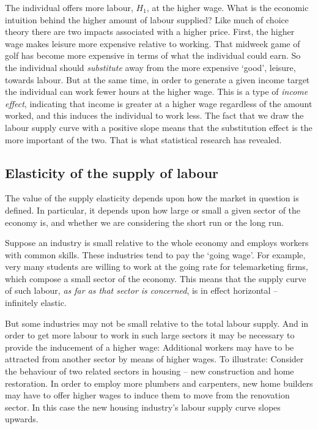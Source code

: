 The individual offers more labour, $H_{1}$, at the higher wage. What is the
economic intuition behind the higher amount of labour supplied? Like much of choice
theory there are two impacts associated with a higher price. First, the
higher wage makes leisure more expensive relative to working. That midweek
game of golf has become more expensive in terms of what the individual could
earn. So the individual should \textit{substitute} away from the more
expensive `good', leisure, towards labour. But at the same time, in order to
generate a given income target the individual can work fewer hours at the
higher wage. This is a type of \textit{income effect}, indicating that
income is greater at a higher wage regardless of the amount worked, and this
induces the individual to work less. The fact that we draw the labour supply
curve with a positive slope means that the substitution effect is
the more important of the two. That is what statistical research has revealed.

\newhtmlpage

\subsection*{Elasticity of the supply of labour}

The value of the supply elasticity depends upon how the market in question
is defined. In particular, it depends upon how large or small a given sector
of the economy is, and whether we are considering the short run or the long
run.

Suppose an industry is small relative to the whole economy and employs
workers with common skills. These industries tend to pay the `going wage'.
For example, very many students are willing to work at the going rate for
telemarketing firms, which compose a small sector of the economy. This means
that the supply curve of such labour, \textit{as far as that sector is
concerned}, is in effect horizontal -- infinitely elastic. 

But some industries may not be small relative to the total labour supply.
And in order to get more labour to work in such large sectors it may be
necessary to provide the inducement of a higher wage: Additional workers may
have to be attracted from another sector by means of higher wages. To
illustrate: Consider the behaviour of two related sectors in housing -- new
construction and home restoration. In order to employ more plumbers and
carpenters, new home builders may have to offer higher wages to induce them
to move from the renovation sector. In this case the new housing industry's
labour supply curve slopes upwards.

